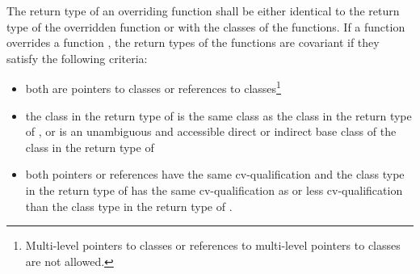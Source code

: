 \pnum
The return type of an overriding function shall be either identical to
the return type of the overridden function or  with
the classes of the functions. If a function  overrides a
function , the return types of the functions are covariant
if they satisfy the following criteria:
\begin{itemize}
\item both are pointers to classes or references to
classes\footnote{Multi-level pointers to classes or references to multi-level pointers to
classes are not allowed.%
}

\item the class in the return type of  is the same class as
the class in the return type of , or is an unambiguous and
accessible direct or indirect base class of the class in the return type
of 

\item both pointers or references have the same cv-qualification and the
class type in the return type of  has the same
cv-qualification as or less cv-qualification than the class type in the
return type of .
\end{itemize}

